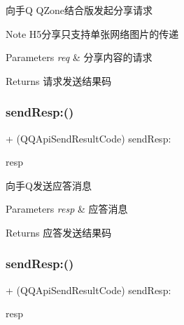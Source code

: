 向手Q Q\+Zone结合版发起分享请求 \begin{DoxyNote}{Note}
H5分享只支持单张网络图片的传递 
\end{DoxyNote}

\begin{DoxyParams}{Parameters}
{\em req} & 分享内容的请求 \\
\hline
\end{DoxyParams}
\begin{DoxyReturn}{Returns}
请求发送结果码 
\end{DoxyReturn}
\mbox{\label{interface_q_q_api_interface_aac1f1046d586eadaebc8d21b2b8041cd}} 
\subsubsection{\texorpdfstring{send\+Resp\+:()}{sendResp:()}\hspace{0.1cm}{\footnotesize\ttfamily [1/2]}}
{\footnotesize\ttfamily + (Q\+Q\+Api\+Send\+Result\+Code) send\+Resp\+: \begin{DoxyParamCaption}\item[{(\mbox{\hyperlink{interface_q_q_base_resp}{Q\+Q\+Base\+Resp}} $\ast$)}]{resp }\end{DoxyParamCaption}}

向手\+Q发送应答消息 
\begin{DoxyParams}{Parameters}
{\em resp} & 应答消息 \\
\hline
\end{DoxyParams}
\begin{DoxyReturn}{Returns}
应答发送结果码 
\end{DoxyReturn}
\mbox{\label{interface_q_q_api_interface_aac1f1046d586eadaebc8d21b2b8041cd}} 
\subsubsection{\texorpdfstring{send\+Resp\+:()}{sendResp:()}\hspace{0.1cm}{\footnotesize\ttfamily [2/2]}}
{\footnotesize\ttfamily + (Q\+Q\+Api\+Send\+Result\+Code) send\+Resp\+: \begin{DoxyParamCaption}\item[{(\mbox{\hyperlink{interface_q_q_base_resp}{Q\+Q\+Base\+Resp}} $\ast$)}]{resp }\end{DoxyParamCaption}}


